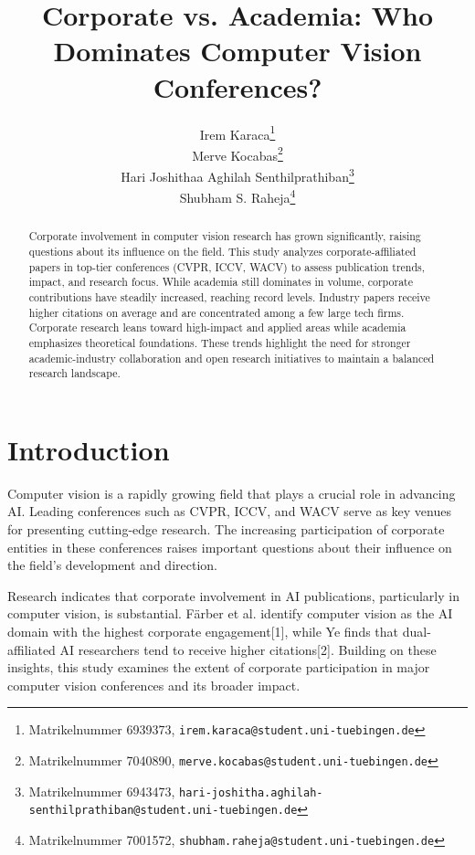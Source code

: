 \documentclass{article}
\title{Corporate vs. Academia: Who Dominates Computer Vision Conferences?}
\author{
  \small Irem Karaca\thanks{Matrikelnummer 6939373, \texttt{irem.karaca@student.uni-tuebingen.de}}\\
  \And
  \small Merve Kocabas\thanks{Matrikelnummer 7040890, \texttt{merve.kocabas@student.uni-tuebingen.de}}\\
  \And
  \small Hari Joshithaa Aghilah Senthilprathiban\thanks{Matrikelnummer 6943473, \texttt{hari-joshitha.aghilah-senthilprathiban@student.uni-tuebingen.de}}\\
  \And
  \small Shubham S. Raheja\thanks{Matrikelnummer 7001572, \texttt{shubham.raheja@student.uni-tuebingen.de}}\\
}
\begin{document}
\maketitle
\vspace{-10pt}
\begin{abstract}

Corporate involvement in computer vision research has grown significantly, raising questions about its influence on the field. This study analyzes corporate-affiliated papers in top-tier conferences (CVPR, ICCV, WACV) to assess publication trends, impact, and research focus. While academia still dominates in volume, corporate contributions have steadily increased, reaching record levels. Industry papers receive higher citations on average and are concentrated among a few large tech firms. Corporate research leans toward high-impact and applied areas while academia emphasizes theoretical foundations. These trends highlight the need for stronger academic-industry collaboration and open research initiatives to maintain a balanced research landscape.

\end{abstract}
\vspace{-10pt}

\section{Introduction}
\vspace{-7pt}
Computer vision is a rapidly growing field that plays a crucial role in advancing AI. Leading conferences such as CVPR, ICCV, and WACV serve as key venues for presenting cutting-edge research. The increasing participation of corporate entities in these conferences raises important questions about their influence on the field’s development and direction.

Research indicates that corporate involvement in AI publications, particularly in computer vision, is substantial. Färber et al. identify computer vision as the AI domain with the highest corporate engagement[1], while Ye finds that dual-affiliated AI researchers tend to receive higher citations[2]. Building on these insights, this study examines the extent of corporate participation in major computer vision conferences and its broader impact.
\end{document}
